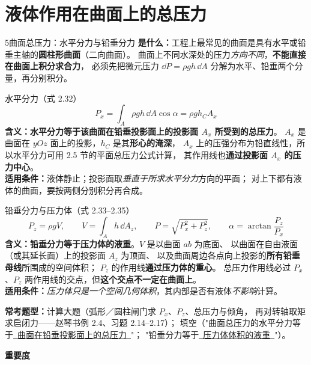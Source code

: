 \section{液体作用在曲面上的总压力}

\begin{kaodian}{5}{曲面总压力：水平分力与铅垂分力}
\textbf{是什么：}工程上最常见的曲面是具有水平或铅垂主轴的\textbf{圆柱形曲面}（二向曲面）。
曲面上不同水深处的压力\emph{方向不同}，\textbf{不能直接在曲面上积分求合力}，
必须先把微元压力 $\dd P=\rho gh\,\dd A$ 分解为水平、铅垂两个分量，再分别积分。

\begin{gongshi}{水平分力（式 2.32）}
\[ P_x=\int_A \rho gh\,\dd A\cos\alpha=\rho g h_C A_x \]
\textbf{含义：}\textbf{水平分力等于该曲面在铅垂投影面上的投影面 $A_x$ 所受到的总压力}。
$A_x$ 是曲面在 $yOz$ 面上的投影，$h_C$ 是其\textbf{形心的淹深}，
$A_x$ 上的压强分布为铅直线性，所以水平分力可用 2.5 节的平面总压力公式计算，
其作用线也\textbf{通过投影面 $A_x$ 的压力中心}。\\
\textbf{适用条件：}液体静止；投影面取\emph{垂直于所求水平分力}方向的平面；
对上下都有液体的曲面，要按两侧分别积分再合成。
\end{gongshi}

\begin{gongshi}{铅垂分力与压力体（式 2.33--2.35）}
\[ P_z=\rho g V,\qquad V=\int_A h\,\dd A_z,\qquad
   P=\sqrt{P_x^2+P_z^2},\qquad \alpha=\arctan\frac{P_z}{P_x} \]
\textbf{含义：}\textbf{铅垂分力等于压力体的液重}。$V$ 是以曲面 $ab$ 为底面、
以曲面在自由液面（或其延长面）上的投影面 $A_z$ 为顶面、
以及曲面周边各点向上投影的\textbf{所有铅垂母线}所围成的空间体积；
$P_z$ 的作用线\textbf{通过压力体的重心}。
总压力作用线必过 $P_x$、$P_z$ 两作用线的交点，但\textbf{这个交点不一定在曲面上}。\\
\textbf{适用条件：}\emph{压力体只是一个空间几何体积}，其内部是否有液体\emph{不影响}计算。
\end{gongshi}

\textbf{常考题型：}计算大题（弧形／圆柱闸门求 $P_x$、$P_z$、总压力与倾角，
再对转轴取矩求启闭力——赵琴书例 2.4、习题 2.14--2.17）；
填空（"曲面总压力的水平分力等于\underline{\ 曲面在铅垂投影面上的总压力\ }"；
"铅垂分力等于\underline{\ 压力体体积的液重\ }"）。

\textbf{重要度 }\quad{}\quad{}


\end{kaodian}
